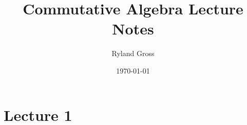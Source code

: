 \documentclass[11pt,a4paper]{article}
\title{Commutative Algebra Lecture Notes}
\author{Ryland Gross}
\date{\today}
\theoremstyle{plain}
\theoremstyle{definition}
\theoremstyle{remark}
\begin{document}
\maketitle

\section{Lecture 1}
\end{document}
